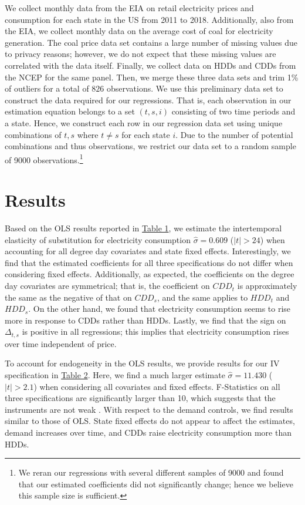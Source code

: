 \documentclass[11pt,a4paper]{extarticle}
\begin{document}
We collect monthly data from the EIA on retail electricity prices and consumption for each state in the US from 2011 to 2018. Additionally, also from the EIA, we collect monthly data on the average cost of coal for electricity generation. The coal price data set contains a large number of missing values due to privacy reasons; however, we do not expect that these missing values are correlated with the data itself. Finally, we collect data on HDDs and CDDs from the NCEP for the same panel. Then, we merge these three data sets and trim 1\% of outliers for a total of $826$ observations. We use this preliminary data set to construct the data required for our regressions. That is, each observation in our estimation equation belongs to a set $(t,s,i)$ consisting of two time periods and a state. Hence, we construct each row in our regression data set using unique combinations of $t,s$ where $t \neq s$ for each state $i$. Due to the number of potential combinations and thus observations, we restrict our data set to a random sample of 9000 observations.\footnote{We reran our regressions with several different samples of 9000 and found that our estimated coefficients did not significantly change; hence we believe this sample size is sufficient.}

\section{Results}

Based on the OLS results reported in \hyperref[table:1]{Table 1}, we estimate the intertemporal elasticity of substitution for electricity consumption $\hat{\sigma}  = 0.609$ ($|t| > 24$) when accounting for all degree day covariates and state fixed effects. Interestingly, we find that the estimated coefficients for all three specifications do not differ when considering fixed effects. Additionally, as expected, the coefficients on the degree day covariates are symmetrical; that is, the coefficient on $CDD_{t}$ is approximately the same as the negative of that on $CDD_{s}$, and the same applies to $HDD_{t}$ and $HDD_{s}$. On the other hand, we found that electricity consumption seems to rise more in response to CDDs rather than HDDs. Lastly, we find that the sign on $\Delta_{t,s}$ is positive in all regressions; this implies that electricity consumption rises over time independent of price. 

To account for endogeneity in the OLS results, we provide results for our IV specification in \hyperref[table:2]{Table 2}. Here, we find a much larger estimate $\hat{\sigma}  = 11.430$ ($|t| > 2.1$) when considering all covariates and fixed effects. F-Statistics on all three specifications are significantly larger than 10, which suggests that the instruments are not weak \citep{SS1997}. With respect to the demand controls, we find results similar to those of OLS. State fixed effects do not appear to affect the estimates, demand increases over time, and CDDs raise electricity consumption more than HDDs. 
\end{document}
